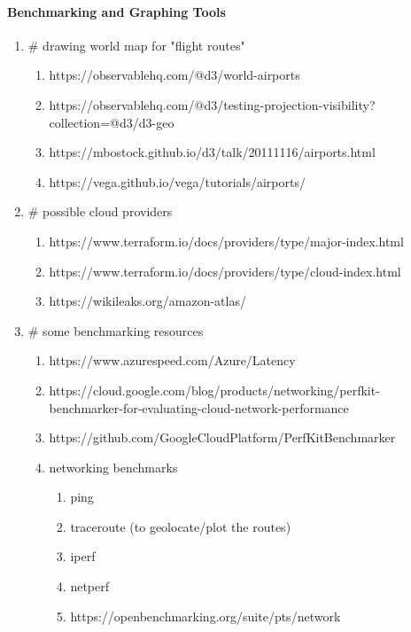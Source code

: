 \documentclass[11pt]{article}
\begin{document}
    \paragraph{Benchmarking and Graphing Tools}
    \begin{enumerate}
        \item # drawing world map for "flight routes"
        \begin{enumerate}
            \item https://observablehq.com/@d3/world-airports
            \item https://observablehq.com/@d3/testing-projection-visibility?collection=@d3/d3-geo
            \item https://mbostock.github.io/d3/talk/20111116/airports.html
            \item https://vega.github.io/vega/tutorials/airports/
        \end{enumerate}

        \item # possible cloud providers
        \begin{enumerate}
            \item https://www.terraform.io/docs/providers/type/major-index.html
            \item https://www.terraform.io/docs/providers/type/cloud-index.html
            \item https://wikileaks.org/amazon-atlas/
        \end{enumerate}

        \item # some benchmarking resources
        \begin{enumerate}
            \item https://www.azurespeed.com/Azure/Latency
            \item https://cloud.google.com/blog/products/networking/perfkit-benchmarker-for-evaluating-cloud-network-performance
            \item https://github.com/GoogleCloudPlatform/PerfKitBenchmarker

            \item networking benchmarks
            \begin{enumerate}
                \item ping
                \item traceroute (to geolocate/plot the routes)
                \item iperf
                \item netperf
                \item https://openbenchmarking.org/suite/pts/network
            \end{enumerate}


\end{enumerate}
\end{enumerate}
\end{document}
